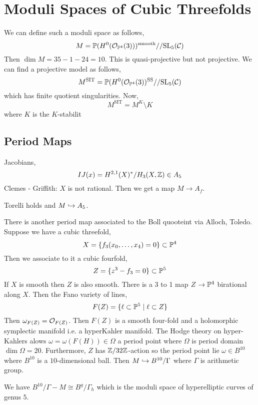 \documentclass[12pt]{article}
\begin{document}
\section{Moduli Spaces of Cubic Threefolds}

We can define such a moduli space as follows,
\[ M = \P (H^0(\struct{\P^4}(3)))^{\text{smooth}} // \SL{5}{\C} \]
Then $\dim{M} = 35 - 1 - 24 = 10$. This is quasi-projective but not projective. We can find a projective model as follows,
\[ M^{\text{SIT}} = \P(H^0(\struct{\P^4}(3))^{\text{SS}} // \SL{5}{\C} \]
which has finite quotient singularities. Now,
\[ M^{\text{SIT}} = M^K \setminus K \]
where $K$ is the $K$-stabilit

\subsection{Period Maps}

Jacobians,
\[ IJ(x) = H^{2,1}(X)^* / H_3(X, \Z) \in A_5 \]
Clemes - Griffith: $X$ is not rational. Then we get a map $M \to A_f$. 

\begin{theorem}
Torelli holds and $M \embed A_5$. 
\end{theorem}

There is another period map associated to the Boll quooteint via Alloch, Toledo. Suppose we have a cubic threefold,
\[ X = \{ f_3(x_0, \dots, x_4) = 0 \} \subset \P^4 \]
Then we associate to it a cubic fourfold,
\[ Z = \{ z^3 - f_3 = 0 \} \subset \P^5 \]
If $X$ is smooth then $Z$ is also smooth. There is a 3 to 1 map $Z \to \P^4$ birational along $X$. Then the Fano variety of lines,
\[ F(Z) = \{ \ell \subset \P^5 \mid \ell \subset Z \} \]
Then $\omega_{F(Z)} = \struct{F(Z)}$. Then $F(Z)$ is a smooth four-fold and a holomorphic symplectic manifold i.e. a hyperKahler manifold. The Hodge theory on hyper-Kahlers alows $\omega = \omega (F(H)) \in \Omega$ a period point 
where $\Omega$ is period domain $\dim{\Omega} = 20$. Furthermore, $Z$ has $\Z / 32 \Z$-action so the period point lie $\omega \in B^{10}$ where $B^{10}$ is a $10$-dimensional ball. Then $M \embed B^{10} / \Gamma$ where $\Gamma$ is arithmetic group. 

\begin{rmk}
We have $B^{10} / \Gamma - M \cong B^g / \Gamma_h$ which is the moduli space of hyperelliptic curves of genus $5$. 
\end{rmk}
\end{document}
